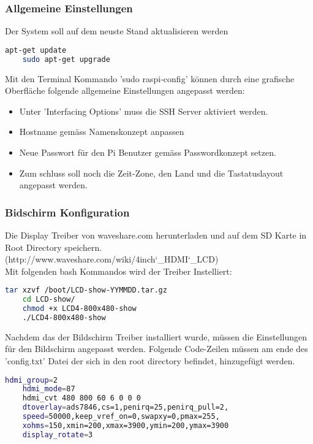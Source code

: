 \subsubsection{Allgemeine Einstellungen}

Der System soll auf dem neuste Stand aktualisieren werden
\begin{lstlisting}[backgroundcolor = \color{snippetcolor},
language = bash,
xleftmargin = 1cm,
framexleftmargin = 0.1em,
breaklines=true]
	apt-get update 
	sudo apt-get upgrade
\end{lstlisting}

Mit den Terminal Kommando 'sudo raspi-config' können durch eine grafische Oberfläche folgende allgemeine Einstellungen angepasst werden:
\begin{itemize}
	\item Unter 'Interfacing Options' muss die SSH Server aktiviert werden.
	\item Hostname gemäss Namenskonzept anpassen
	\item Neue Passwort für den Pi Benutzer gemäss Passwordkonzept setzen.
	\item Zum schluss soll noch die Zeit-Zone, den Land und die Tastatuslayout angepasst werden.
\end{itemize}

\subsubsection{Bidschirm Konfiguration}
Die Display Treiber von waveshare.com herunterladen und auf dem SD Karte in Root Directory speichern. (http://www.waveshare.com/wiki/4inch\char`_HDMI\char`_LCD)\\
Mit folgenden bash Kommandos wird der Treiber Instelliert:
\begin{lstlisting}[backgroundcolor = \color{snippetcolor},
language = bash,
xleftmargin = 1cm,
framexleftmargin = 0.1em,
breaklines=true]
	tar xzvf /boot/LCD-show-YYMMDD.tar.gz 
	cd LCD-show/
	chmod +x LCD4-800x480-show
	./LCD4-800x480-show
\end{lstlisting}
Nachdem das der Bildschirm Treiber installiert wurde, müssen die Einstellungen für den Bildschirm angepasst werden. Folgende Code-Zeilen müssen am ende des 'config.txt' Datei der sich in den root directory befindet, hinzugefügt werden.
\begin{lstlisting}[backgroundcolor = \color{snippetcolor},
language = bash,
xleftmargin = 1cm,
framexleftmargin = 0.1em,
breaklines=true]
	hdmi_group=2
	hdmi_mode=87
	hdmi_cvt 480 800 60 6 0 0 0
	dtoverlay=ads7846,cs=1,penirq=25,penirq_pull=2,
	speed=50000,keep_vref_on=0,swapxy=0,pmax=255,
	xohms=150,xmin=200,xmax=3900,ymin=200,ymax=3900
	display_rotate=3
\end{lstlisting}

